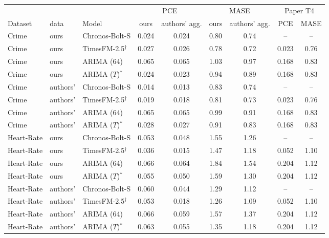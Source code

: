 \begin{tabular}{lllcccccc}
\toprule
 & & & \multicolumn{2}{c}{PCE} & \multicolumn{2}{c}{MASE} & \multicolumn{2}{c}{Paper T4} \\
\cmidrule(lr){4-5}\cmidrule(lr){6-7}\cmidrule(lr){8-9}
Dataset & data & Model & ours & authors' agg. & ours & authors' agg. & PCE & MASE \\
\midrule
Crime & ours & Chronos-Bolt-S & 0.024 & 0.024 & 0.80 & 0.74 & -- & -- \\
Crime & ours & TimesFM-2.5$^\dagger$ & 0.027 & 0.026 & 0.78 & 0.72 & 0.023 & 0.76 \\
Crime & ours & ARIMA (64) & 0.065 & 0.065 & 1.03 & 0.97 & 0.168 & 0.83 \\
Crime & ours & ARIMA ($T$)$^\ast$ & 0.024 & 0.023 & 0.94 & 0.89 & 0.168 & 0.83 \\
Crime & authors' & Chronos-Bolt-S & 0.014 & 0.013 & 0.83 & 0.74 & -- & -- \\
Crime & authors' & TimesFM-2.5$^\dagger$ & 0.019 & 0.018 & 0.81 & 0.73 & 0.023 & 0.76 \\
Crime & authors' & ARIMA (64) & 0.065 & 0.065 & 0.99 & 0.91 & 0.168 & 0.83 \\
Crime & authors' & ARIMA ($T$)$^\ast$ & 0.028 & 0.027 & 0.91 & 0.83 & 0.168 & 0.83 \\
Heart-Rate & ours & Chronos-Bolt-S & 0.053 & 0.048 & 1.55 & 1.26 & -- & -- \\
Heart-Rate & ours & TimesFM-2.5$^\dagger$ & 0.036 & 0.015 & 1.47 & 1.18 & 0.052 & 1.10 \\
Heart-Rate & ours & ARIMA (64) & 0.066 & 0.064 & 1.84 & 1.54 & 0.204 & 1.12 \\
Heart-Rate & ours & ARIMA ($T$)$^\ast$ & 0.055 & 0.050 & 1.59 & 1.30 & 0.204 & 1.12 \\
Heart-Rate & authors' & Chronos-Bolt-S & 0.060 & 0.044 & 1.29 & 1.12 & -- & -- \\
Heart-Rate & authors' & TimesFM-2.5$^\dagger$ & 0.053 & 0.018 & 1.26 & 1.09 & 0.052 & 1.10 \\
Heart-Rate & authors' & ARIMA (64) & 0.066 & 0.059 & 1.57 & 1.37 & 0.204 & 1.12 \\
Heart-Rate & authors' & ARIMA ($T$)$^\ast$ & 0.063 & 0.055 & 1.35 & 1.18 & 0.204 & 1.12 \\
\bottomrule
\end{tabular}
